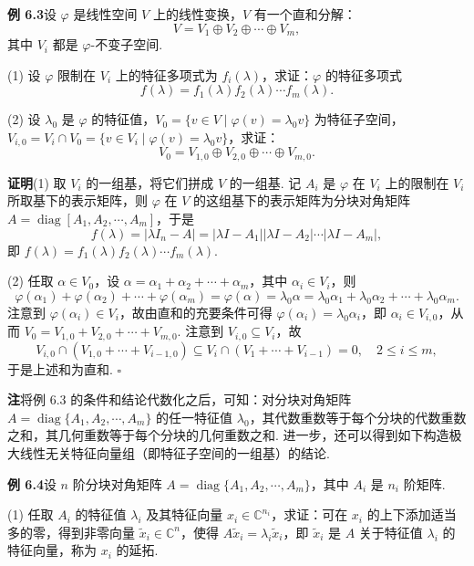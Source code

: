 \documentclass[UTF8, 12pt, fontset=fandol, oneside]{ctexart}
\begin{document}
\noindent\textbf{例 6.3}\quad 设 $\varphi$ 是线性空间 $V$ 上的线性变换，$V$ 有一个直和分解：
\[
V=V_1\oplus V_2\oplus\cdots\oplus V_m,
\]
其中 $V_i$ 都是 $\varphi$-不变子空间.

(1) 设 $\varphi$ 限制在 $V_i$ 上的特征多项式为 $f_i(\lambda)$，求证：$\varphi$ 的特征多项式
\[
f(\lambda)=f_1(\lambda)f_2(\lambda)\cdots f_m(\lambda).
\]

(2) 设 $\lambda_0$ 是 $\varphi$ 的特征值，$V_0=\{v\in V\mid \varphi(v)=\lambda_0v\}$ 为特征子空间，$V_{i,0}=V_i\cap V_0=\{v\in V_i\mid \varphi(v)=\lambda_0v\}$，求证：
\[
V_0=V_{1,0}\oplus V_{2,0}\oplus\cdots\oplus V_{m,0}.
\]

\noindent\textbf{证明}\quad (1) 取 $V_i$ 的一组基，将它们拼成 $V$ 的一组基. 记 $A_i$ 是 $\varphi$ 在 $V_i$ 上的限制在 $V_i$ 所取基下的表示矩阵，则 $\varphi$ 在 $V$ 的这组基下的表示矩阵为分块对角矩阵 $A=\operatorname{diag}[A_1,A_2,\cdots,A_m]$，于是
\[
f(\lambda)=|\lambda I_n-A|=|\lambda I-A_1||\lambda I-A_2|\cdots|\lambda I-A_m|,
\]
即 $f(\lambda)=f_1(\lambda)f_2(\lambda)\cdots f_m(\lambda)$.

(2) 任取 $\alpha\in V_0$，设 $\alpha=\alpha_1+\alpha_2+\cdots+\alpha_m$，其中 $\alpha_i\in V_i$，则
\[
\varphi(\alpha_1)+\varphi(\alpha_2)+\cdots+\varphi(\alpha_m)=\varphi(\alpha)=\lambda_0\alpha=\lambda_0\alpha_1+\lambda_0\alpha_2+\cdots+\lambda_0\alpha_m.
\]
注意到 $\varphi(\alpha_i)\in V_i$，故由直和的充要条件可得 $\varphi(\alpha_i)=\lambda_0\alpha_i$，即 $\alpha_i\in V_{i,0}$，从而 $V_0=V_{1,0}+V_{2,0}+\cdots+V_{m,0}$. 注意到 $V_{i,0}\subseteq V_i$，故
\[
V_{i,0}\cap (V_{1,0}+\cdots+V_{i-1,0})\subseteq V_i\cap (V_1+\cdots+V_{i-1})=0,\quad 2\le i\le m,
\]
于是上述和为直和. $\square$

\noindent\textbf{注}\quad 将例 6.3 的条件和结论代数化之后，可知：对分块对角矩阵 $A=\operatorname{diag}\{A_1,A_2,\cdots,A_m\}$ 的任一特征值 $\lambda_0$，其代数重数等于每个分块的代数重数之和，其几何重数等于每个分块的几何重数之和. 进一步，还可以得到如下构造极大线性无关特征向量组（即特征子空间的一组基）的结论.

\noindent\textbf{例 6.4}\quad 设 $n$ 阶分块对角矩阵 $A=\operatorname{diag}\{A_1,A_2,\cdots,A_m\}$，其中 $A_i$ 是 $n_i$ 阶矩阵.

(1) 任取 $A_i$ 的特征值 $\lambda_i$ 及其特征向量 $x_i\in\mathbb{C}^{n_i}$，求证：可在 $x_i$ 的上下添加适当多的零，得到非零向量 $\widetilde{x}_i\in\mathbb{C}^n$，使得 $A\widetilde{x}_i=\lambda_i\widetilde{x}_i$，即 $\widetilde{x}_i$ 是 $A$ 关于特征值 $\lambda_i$ 的特征向量，称为 $x_i$ 的延拓.
\end{document}
